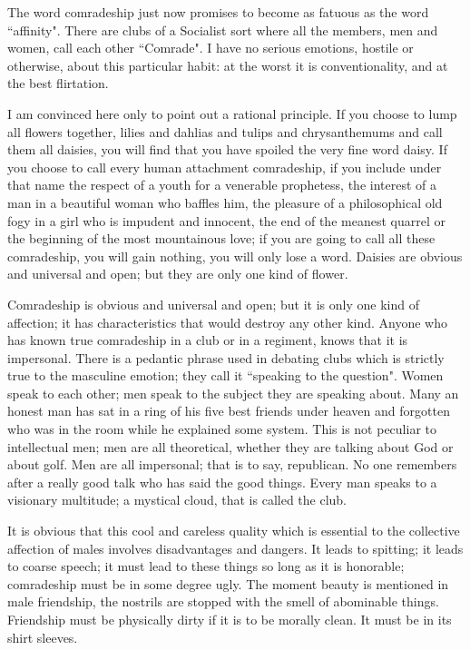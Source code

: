 \documentclass[final,10pt,letterpaper,twocolumn,openany]{book}
\begin{document}
The word comradeship just now promises to become as fatuous as the
word ``affinity". There are clubs of a Socialist sort where all the members,
men and women, call each other ``Comrade". I have no serious emotions,
hostile or otherwise, about this particular habit: at the worst it is
conventionality, and at the best flirtation.

 I am convinced here only to
point out a rational principle. If you choose to lump all flowers together,
lilies and dahlias and tulips and chrysanthemums and call them all daisies,
you will find that you have spoiled the very fine word daisy. If you choose
to call every human attachment comradeship, if you include under that
name the respect of a youth for a venerable prophetess, the interest of a
man in a beautiful woman who baffles him, the pleasure of a philosophical
old fogy in a girl who is impudent and innocent, the end of the meanest
quarrel or the beginning of the most mountainous love; if you are going to
call all these comradeship, you will gain nothing, you will only lose a
word. Daisies are obvious and universal and open; but they are only one
kind of flower. 

Comradeship is obvious and universal and open; but it is
only one kind of affection; it has characteristics that would destroy any
other kind. Anyone who has known true comradeship in a club or in a
regiment, knows that it is impersonal. There is a pedantic phrase used in
debating clubs which is strictly true to the masculine emotion; they call it
``speaking to the question". Women speak to each other; men speak to the
subject they are speaking about. Many an honest man has sat in a ring of
his five best friends under heaven and forgotten who was in the room
while he explained some system. This is not peculiar to intellectual men;
men are all theoretical, whether they are talking about God or about golf.
Men are all impersonal; that is to say, republican. No one remembers after
a really good talk who has said the good things. Every man speaks to a
visionary multitude; a mystical cloud, that is called the club.

It is obvious that this cool and careless quality which is essential to the
collective affection of males involves disadvantages and dangers. It leads
to spitting; it leads to coarse speech; it must lead to these things so long as
it is honorable; comradeship must be in some degree ugly. The moment
beauty is mentioned in male friendship, the nostrils are stopped with the
smell of abominable things. Friendship must be physically dirty if it is to
be morally clean. It must be in its shirt sleeves. 
\end{document}

